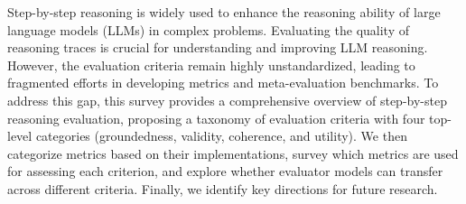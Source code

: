 Step-by-step reasoning is widely used to enhance the reasoning ability of large language models (LLMs) in complex problems. 
Evaluating the quality of reasoning traces is crucial for understanding and improving LLM reasoning. However, the evaluation criteria remain highly unstandardized, leading to fragmented efforts in developing metrics and meta-evaluation benchmarks. To address this gap, this survey provides a comprehensive overview of step-by-step reasoning evaluation, proposing a taxonomy of evaluation criteria with four top-level categories (groundedness, validity, coherence, and utility). We then categorize metrics based on their implementations, survey which metrics are used for assessing each criterion, and explore whether evaluator models can transfer across different criteria. Finally, we identify key directions for future research.